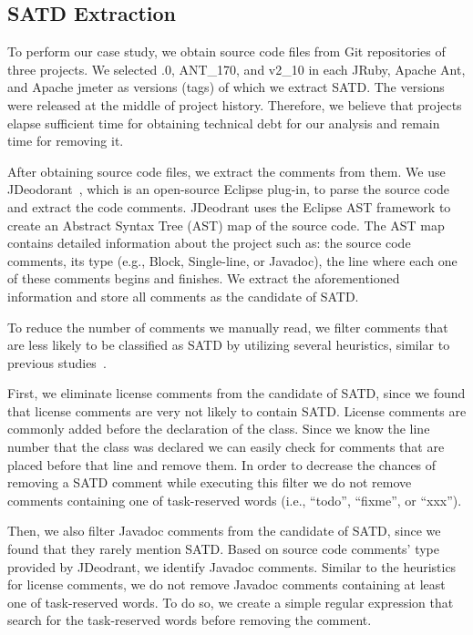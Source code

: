 \documentclass[conference]{IEEEtran}
\begin{document}

\subsection{SATD Extraction}
To perform our case study, we obtain source code files from Git repositories of three projects. We selected {.0}, {\sc ANT\_170}, and {\sc v2\_10} in each JRuby, Apache Ant, and Apache jmeter as versions (tags) of which we extract SATD. The versions were released at the middle of project history. Therefore, we believe that projects elapse sufficient time for obtaining technical debt for our analysis and remain time for removing it.

After obtaining source code files, we extract the comments from them. We use JDeodorant~\cite{Tsantalis2008CSMR}, which is an open-source Eclipse plug-in, to parse the source code and extract the code comments. JDeodrant uses the Eclipse AST framework to create an Abstract Syntax Tree (AST) map of the source code. The AST map contains detailed information about the project such as: the source code comments, its type (e.g., Block, Single-line, or Javadoc), the line where each one of these comments begins and finishes. We extract the aforementioned information and store all comments as the candidate of SATD.

To reduce the number of comments we manually read, we filter comments that are less likely to be classified as SATD by utilizing several heuristics, similar to previous studies~\cite{Maldonado2015MTD}.

First, we eliminate license comments from the candidate of SATD, since we found that license comments are very not likely to contain SATD. License comments are commonly added before the declaration of the class. Since we know the line number that the class was declared we can easily check for comments that are placed before that line and remove them. In order to decrease the chances of removing a SATD comment while executing this filter we do not remove comments containing one of task-reserved words (i.e., “todo”, “fixme”, or “xxx”).

Then, we also filter Javadoc comments from the candidate of SATD, since we found that they rarely mention SATD. Based on source code comments' type provided by JDeodrant, we identify Javadoc comments. Similar to the heuristics for license comments, we do not remove Javadoc comments containing at least one of task-reserved words. To do so, we create a simple regular expression that search for the task-reserved words before removing the comment.
\end{document}
